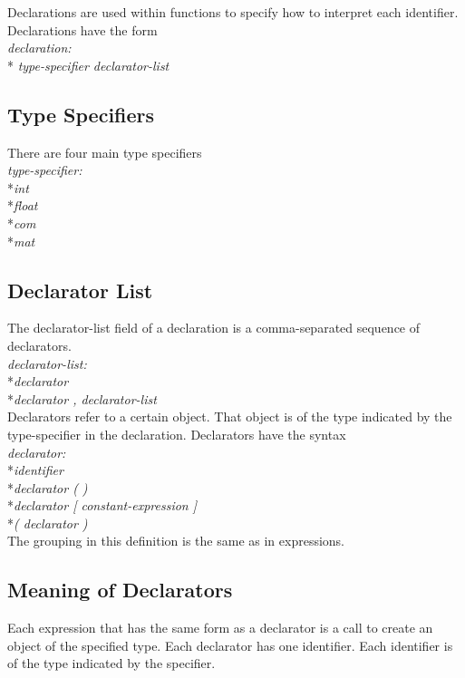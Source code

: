 Declarations are used within functions to specify how to interpret each identifier. Declarations have the form\\

	\textit{ declaration: }
		\\*\indent\indent\textit{ type-specifier declarator-list}

\subsection{Type Specifiers}

There are four main type specifiers\\

	\textit{type-specifier: }
		\\*\indent\indent\textit{int}
		\\*\indent\indent\textit{float}
		\\*\indent\indent\textit{com}
		\\*\indent\indent\textit{mat}

\subsection{ Declarator List }
The declarator-list field of a declaration is a comma-separated sequence of declarators.\\

	\textit{declarator-list:}
		\\*\indent\indent\textit{declarator}
		\\*\indent\indent\textit{declarator , declarator-list}\\

Declarators refer to a certain object. That object is of the type indicated by the type-specifier in the declaration. Declarators have the syntax\\

	\textit{declarator:}
		\\*\indent\indent\textit{identifier}
		\\*\indent\indent\textit{declarator ( )}
		\\*\indent\indent\textit{declarator [ constant-expression ]}
		\\*\indent\indent\textit{( declarator )}\\

The grouping in this definition is the same as in expressions.				

\subsection{ Meaning of Declarators }
Each expression that has the same form as a declarator is a call to create an object of the specified type. Each declarator has one identifier. Each identifier is of the type indicated by the specifier.\\

